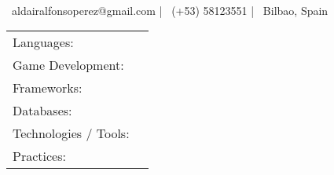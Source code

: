 \documentclass[]{awesome-cv}
\begin{document}
\begin{center}
	  \\
	\vspace{2mm}
	{\hspace{0.8cm}\faEnvelope\ aldairalfonsoperez@gmail.com}  |  {\faMobile\ (+53) 58123551}  |  {\faMapMarker\ Bilbao, Spain}
\end{center}

\begin{cventries}
	\cventry
	{}
	{\def\arraystretch{1.15}{\begin{tabular}{ l l }
				Languages:                            & {\skill{ C\# (Advanced), Python, C, C++, SQL, JavaScript.}}                           \\
				Game Development:                     & {\skill{ Unity 3D (Learning), Game Logic Design, UI/UX Design, Network Programming.}} \\
				Frameworks:                           & {\skill{ .Net, ASP.NET, Django, FastAPI.}}                                            \\
				Databases:                            & {\skill{ MySQL, PostgreSQL, SQLite.}}                                                 \\
				Technologies / Tools: \hspace{0.05cm} & {\skill{ Visual Studio, Unity Editor, Git, Docker, npm.}}                             \\
				Practices:                            & {\skill{ Agile, Scrum, SOLID Principles, Test-Driven Development, Code Reviews.}}     \\
			\end{tabular}}}
	{}
	{}
	{}
\end{cventries}
\vspace{-7mm}
\end{document}
